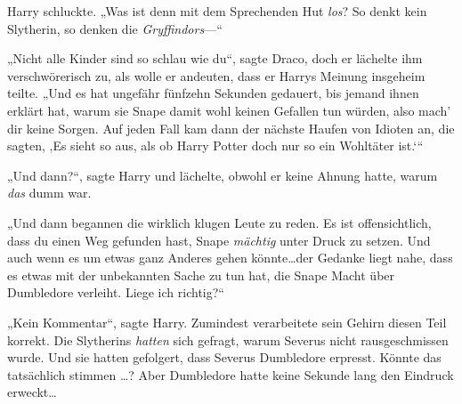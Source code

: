 Harry schluckte. „Was ist denn mit dem Sprechenden Hut \emph{los}? So denkt kein Slytherin, so denken die \emph{Gryffindors}—“

„Nicht alle Kinder sind so schlau wie du“, sagte Draco, doch er lächelte ihm verschwörerisch zu, als wolle er andeuten, dass er Harrys Meinung insgeheim teilte. „Und es hat ungefähr fünfzehn Sekunden gedauert, bis jemand ihnen erklärt hat, warum sie Snape damit wohl keinen Gefallen tun würden, also mach’ dir keine Sorgen. Auf jeden Fall kam dann der nächste Haufen von Idioten an, die sagten, ‚Es sieht so aus, als ob Harry Potter doch nur so ein Wohltäter ist.‘“

„Und dann?“, sagte Harry und lächelte, obwohl er keine Ahnung hatte, warum \emph{das} dumm war.

„Und dann begannen die wirklich klugen Leute zu reden. Es ist offensichtlich, dass du einen Weg gefunden hast, Snape \emph{mächtig} unter Druck zu setzen. Und auch wenn es um etwas ganz Anderes gehen könnte…der Gedanke liegt nahe, dass es etwas mit der unbekannten Sache zu tun hat, die Snape Macht über Dumbledore verleiht. Liege ich richtig?“

„Kein Kommentar“, sagte Harry. Zumindest verarbeitete sein Gehirn diesen Teil korrekt. Die Slytherins \emph{hatten} sich gefragt, warum Severus nicht rausgeschmissen wurde. Und sie hatten gefolgert, dass Severus Dumbledore erpresst. Könnte das tatsächlich stimmen …? Aber Dumbledore hatte keine Sekunde lang den Eindruck erweckt…

